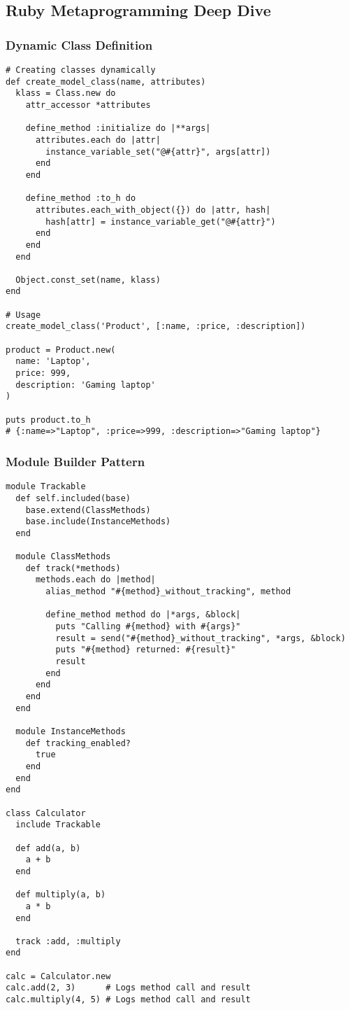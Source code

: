 \documentclass[12pt,a4paper]{article}
\begin{document}
\subsection{Ruby Metaprogramming Deep Dive}

\subsubsection{Dynamic Class Definition}

\begin{lstlisting}
# Creating classes dynamically
def create_model_class(name, attributes)
  klass = Class.new do
    attr_accessor *attributes
    
    define_method :initialize do |**args|
      attributes.each do |attr|
        instance_variable_set("@#{attr}", args[attr])
      end
    end
    
    define_method :to_h do
      attributes.each_with_object({}) do |attr, hash|
        hash[attr] = instance_variable_get("@#{attr}")
      end
    end
  end
  
  Object.const_set(name, klass)
end

# Usage
create_model_class('Product', [:name, :price, :description])

product = Product.new(
  name: 'Laptop',
  price: 999,
  description: 'Gaming laptop'
)

puts product.to_h
# {:name=>"Laptop", :price=>999, :description=>"Gaming laptop"}
\end{lstlisting}

\subsubsection{Module Builder Pattern}

\begin{lstlisting}
module Trackable
  def self.included(base)
    base.extend(ClassMethods)
    base.include(InstanceMethods)
  end

  module ClassMethods
    def track(*methods)
      methods.each do |method|
        alias_method "#{method}_without_tracking", method
        
        define_method method do |*args, &block|
          puts "Calling #{method} with #{args}"
          result = send("#{method}_without_tracking", *args, &block)
          puts "#{method} returned: #{result}"
          result
        end
      end
    end
  end

  module InstanceMethods
    def tracking_enabled?
      true
    end
  end
end

class Calculator
  include Trackable
  
  def add(a, b)
    a + b
  end
  
  def multiply(a, b)
    a * b
  end
  
  track :add, :multiply
end

calc = Calculator.new
calc.add(2, 3)      # Logs method call and result
calc.multiply(4, 5) # Logs method call and result
\end{lstlisting}
\end{document}
